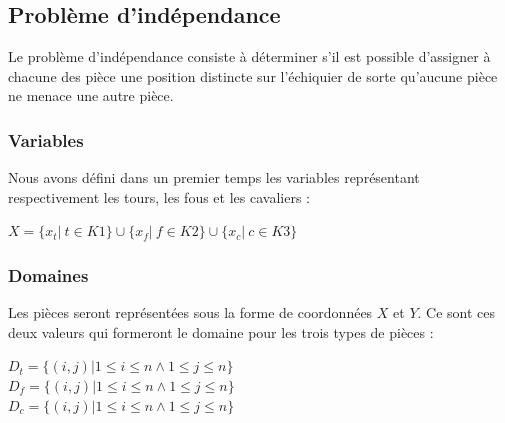 \documentclass[a4paper]{article}
\begin{document}
\subsection{Problème d'indépendance}
Le problème d’indépendance consiste à déterminer s’il est possible d’assigner à chacune des pièce une position distincte sur l'échiquier de sorte qu’aucune pièce ne menace une autre pièce.\\ 
\begin{center}
\end{center}

\subsubsection{Variables}
Nous avons défini dans un premier temps les variables représentant respectivement les tours, les fous et les cavaliers : 
\begin{center}
$X = \{ x_t | \ t \in K1 \}  \cup \{ x_f | \ f \in K2 \} \cup \{ x_c | \ c \in K3 \}$
\end{center}
\subsubsection{Domaines}
Les pièces seront représentées sous la forme de coordonnées $X$ et $Y$. Ce sont ces deux valeurs qui formeront le domaine pour les trois types de pièces : 
\begin{center}
$D_t = \{ (i,j) | 1 \leq i \leq n \wedge 1 \leq j \leq n \}$ \\
$D_f = \{ (i,j) | 1 \leq i \leq n \wedge 1 \leq j \leq n \}$ \\
$D_c = \{ (i,j) | 1 \leq i \leq n \wedge 1 \leq j \leq n \}$
\end{center}
\end{document}
